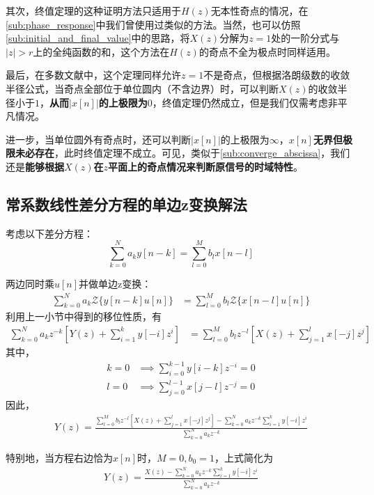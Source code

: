 其次，终值定理的这种证明方法只适用于$H(z)$无本性奇点的情况，在\ref{sub:phase_response}中我们曾使用过类似的方法。当然，也可以仿照\ref{sub:initial_and_final_value}中的思路，将$X(z)$分解为$z=1$处的一阶分式与$|z|>r$上的全纯函数的和，这个方法在$H(z)$的奇点不全为极点时同样适用。

最后，在多数文献中，这个定理同样允许$z=1$不是奇点，但根据洛朗级数的收敛半径公式，当奇点全部位于单位圆内（不含边界）时，可以判断$X(z)$的收敛半径小于$1$，\textbf{从而$|x[n]|$的上极限为$0$}，终值定理仍然成立，但是我们仅需考虑非平凡情况。

进一步，当单位圆外有奇点时，还可以判断$|x[n]|$的上极限为$\infty$，\textbf{$x[n]$无界但极限未必存在}，此时终值定理不成立。可见，类似于\ref{sub:converge_abscissa}，我们还是\textbf{能够根据$X(z)$在$z$平面上的奇点情况来判断原信号的时域特性}。

\subsection{常系数线性差分方程的单边z变换解法}\label{sub:z_difference_equation}

考虑以下差分方程：
$$\sum_{k=0}^{N}a_k y[n-k] = \sum_{l=0}^{M}b_l x[n-l]$$


两边同时乘$u[n]$并做单边z变换：
\begin{align*}
    \sum_{k=0}^{N}a_k \mathcal{Z}\{y[n-k]u[n]\}&=\sum_{l=0}^{M}b_l \mathcal{Z}\{x[n-l]u[n]\}
\end{align*}
利用上一小节中得到的移位性质，有\begin{align*}
    \sum_{k=0}^{N}a_k z^{-k}\left[Y(z)+\sum_{i=1}^{k}y[-i]z^{i}\right]&=\sum_{l=0}^{M}b_l z^{-l}\left[X(z)+\sum_{j=1}^{l}x[-j]z^{j}\right]
\end{align*}
其中，\begin{align*}
    k=0&\implies \sum_{i=0}^{k-1}y[i-k]z^{-i}=0\\
    l=0&\implies \sum_{j=0}^{l-1}x[j-l]z^{-j}=0
\end{align*}
因此，\begin{align*}
    Y(z)=\frac{\sum_{l=0}^{M}b_l z^{-l}\left[X(z)+\sum_{j=1}^{l}x[-j]z^{j}\right]-\sum_{k=0}^{N}a_k z^{-k}\sum_{i=1}^{k}y[-i]z^{i}}{\sum_{k=0}^{N}a_k z^{-k}}
\end{align*}

特别地，当方程右边恰为$x[n]$时，$M=0,b_0=1$，上式简化为\begin{align*}
    Y(z)=\frac{X(z)-\sum_{k=0}^{N}a_k z^{-k}\sum_{i=1}^{k}y[-i]z^{i}}{\sum_{k=0}^{N}a_k z^{-k}}
\end{align*}

